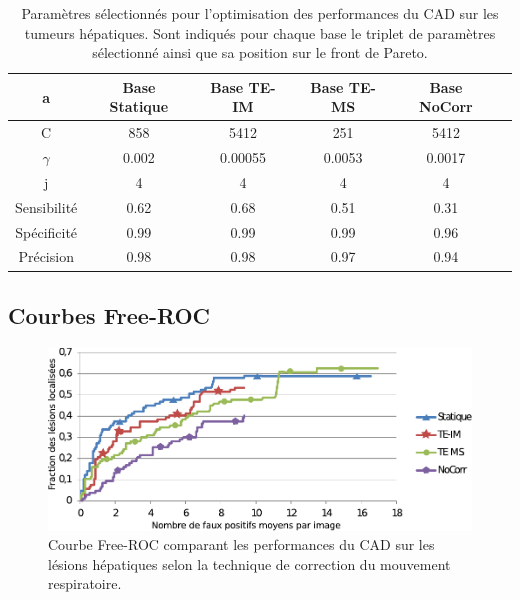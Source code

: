 \begin{table}[h!]
\begin{center}
		\begin{tabular}{c| c c c c c}
  \hline
  a	& Base Statique	& Base TE-IM	& Base TE-MS	& Base NoCorr	\\
  \hline
 C 	& 858		& 5412		& 251		& 5412		\\
\hline
$\gamma$& 0.002		& 0.00055	& 0.0053	& 0.0017	\\
\hline
j	& 4		& 4		& 4		& 4		\\
\hline
\hline
Sensibilité& 0.62	& 0.68		& 0.51		& 0.31	\\
\hline
Spécificité& 0.99	& 0.99		& 0.99		& 0.96		\\
\hline
Précision& 0.98		& 0.98		& 0.97		& 0.94		\\
\hline
 		\end{tabular}

\end{center}
\caption[Paramètres sélectionnés pour l'optimisation des performances du CAD sur les tumeurs hépatiques]{Paramètres sélectionnés pour l'optimisation des performances du CAD sur les tumeurs hépatiques. Sont indiqués pour chaque base le triplet de paramètres sélectionné ainsi que sa position sur le front de Pareto.}
\label{fig:paramsModFoie}
\end{table}

\subsection{Courbes Free-ROC}

\begin{figure}[h!]
 \begin{center}
   \includegraphics[width=15cm]{images/FROC_mod19_corrige}
   \vspace{-0.3cm}
 \end{center}
 \caption{Courbe Free-ROC comparant les performances du CAD sur les lésions hépatiques selon la technique de correction du mouvement respiratoire.}
\label{fig:froc_mod19}
\end{figure}


